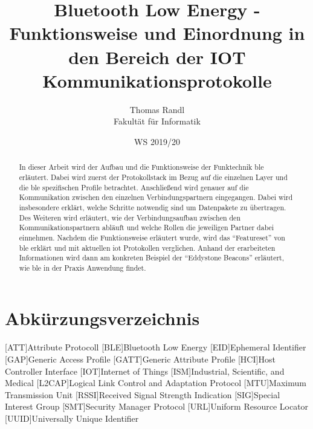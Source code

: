 \documentclass[twoside=true, %
    DIV=15
    ,%
    BCOR=15mm, %
    headinclude=true,
    footinclude=false,
    pagesize,%
    fontsize=12pt,%
    paper=a4,%
    numbers=noenddot
  ]{scrartcl}
\begin{document}
\def\figdir{figures}
\def\tabledir{tables}

\titlehead{
\raggedleft
\texttt{[image: \\figdir/logo-th-rosenheim-2019\_master\_quer\_2c.eps]}
}

\title{
\vspace*{0cm}
Bluetooth Low Energy - Funktionsweise und Einordnung in den Bereich der IOT Kommunikationsprotokolle
}

\author{
Thomas Randl\\
Fakultät für Informatik}

\date{WS 2019/20}

\maketitle

\begin{abstract}
In dieser Arbeit wird der Aufbau und die Funktionsweise der Funktechnik \ac{ble} erläutert. Dabei wird zuerst der Protokollstack im Bezug auf die einzelnen Layer und die \ac{ble} spezifischen Profile betrachtet. Anschließend wird genauer auf die Kommunikation zwischen den einzelnen Verbindungspartnern eingegangen. Dabei wird insbesondere erklärt, welche Schritte notwendig sind um Datenpakete zu übertragen. Des Weiteren wird erläutert, wie der Verbindungsaufbau zwischen den Kommunikationspartnern abläuft und welche Rollen die jeweiligen Partner dabei einnehmen. Nachdem die Funktionsweise erläutert wurde, wird das "`Featureset"' von \ac{ble} erklärt und mit aktuellen \ac{iot} Protokollen verglichen. Anhand der erarbeiteten Informationen wird dann am konkreten Beispiel der "`Eddystone Beacons"' erläutert, wie \ac{ble} in der Praxis Anwendung findet.
\end{abstract}

\newpage

\tableofcontents

\newpage

\section*{Abkürzungsverzeichnis} %
\begin{acronym}[ECUAFFF]
	[ATT]{Attribute Protocoll}
	[BLE]{Bluetooth Low Energy}
	[EID]{Ephemeral Identifier}
	[GAP]{Generic Access Profile}
	[GATT]{Generic Attribute Profile}
	[HCI]{Host Controller Interface}
	[IOT]{Internet of Things}
	[ISM]{Industrial, Scientific, and Medical}
	[L2CAP]{Logical Link Control and Adaptation Protocol}
	[MTU]{Maximum Transmission Unit}
	[RSSI]{Received Signal Strength Indication}
	[SIG]{Special Interest Group}
	[SMT]{Security Manager Protocol}
	[URL]{Uniform Resource Locator}
	[UUID]{Universally Unique Identifier}
\end{acronym}









%




\end{document}
